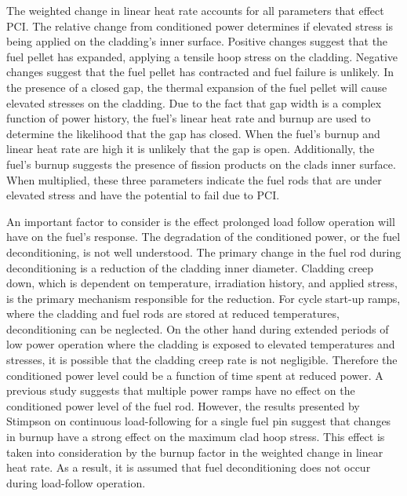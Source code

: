 \documentclass[edeposit,fullpage,11pt]{uiucthesis2009}
\begin{document}
The weighted change in linear heat rate accounts for all parameters that effect \gls{PCI}.
The relative change from conditioned power determines if elevated stress is being applied on the cladding's inner surface.
Positive changes suggest that the fuel pellet has expanded, applying a tensile hoop stress on the cladding.
Negative changes suggest that the fuel pellet has contracted and fuel failure is unlikely.
In the presence of a closed gap, the thermal expansion of the fuel pellet will cause elevated stresses on the cladding.
Due to the fact that gap width is a complex function of power history, the fuel's linear heat rate and burnup are used to determine the likelihood that the gap has closed.
When the fuel's burnup and linear heat rate are high it is unlikely that the gap is open.
Additionally, the fuel's burnup suggests the presence of fission products on the clads inner surface.
When multiplied, these three parameters indicate the fuel rods that are under elevated stress and have the potential to fail due to \gls{PCI}.

An important factor to consider is the effect prolonged load follow operation will have on the fuel's response.
The degradation of the conditioned power, or the fuel deconditioning, is not well understood.
The primary change in the fuel rod during deconditioning is a reduction of the cladding inner diameter.
Cladding creep down, which is dependent on temperature, irradiation history, and applied stress, is the primary mechanism responsible for the reduction.  
For cycle start-up ramps, where the cladding and fuel rods are stored at reduced temperatures, deconditioning can be neglected. %
On the other hand during extended periods of low power operation where the cladding is exposed to elevated temperatures and stresses, it is possible that the cladding creep rate is not negligible.
Therefore the conditioned power level could be a function of time spent at reduced power.
A previous study \cite{galrtner_survey_1987} suggests that multiple power ramps have no effect on the conditioned power level of the fuel rod.  
However, the results presented by Stimpson \cite{stimpson_demonstration_2017} on continuous load-following for a single fuel pin suggest that changes in burnup have a strong effect on the maximum clad hoop stress.
This effect is taken into consideration by the burnup factor in the weighted change in linear heat rate.
As a result, it is assumed that fuel deconditioning does not occur during load-follow operation.


\end{document}
